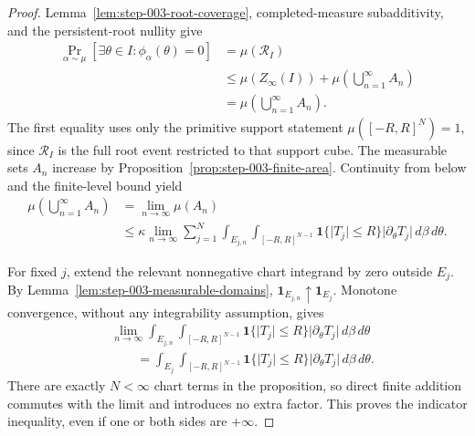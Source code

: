 \begin{proof}
Lemma~\ref{lem:step-003-root-coverage}, completed-measure subadditivity, and the
persistent-root nullity give
\begin{equation}
\label{eq:appendix-display-099}
\begin{aligned}
\Pr_{\alpha\sim\mu}
[\exists\theta\in I:\phi_\alpha(\theta)=0]
&=\mu(\mathcal R_I)\\
&\leq
\mu(Z_\infty(I))
+\mu\left(\bigcup_{n=1}^{\infty}A_n\right)\\
&=
\mu\left(\bigcup_{n=1}^{\infty}A_n\right).
\end{aligned}
\end{equation}
The first equality uses only the primitive support statement
\(\mu([-R,R]^N)=1\), since \(\mathcal R_I\) is the full root event restricted to that support cube.
The measurable sets \(A_n\) increase by
Proposition~\ref{prop:step-003-finite-area}. Continuity from below and the finite-level bound yield
\begin{equation}
\label{eq:appendix-display-100}
\begin{aligned}
\mu\left(\bigcup_{n=1}^{\infty}A_n\right)
&=\lim_{n\to\infty}\mu(A_n)\\
&\leq
\kappa\lim_{n\to\infty}
\sum_{j=1}^N
\int_{E_{j,n}}\int_{[-R,R]^{N-1}}
\mathbf 1\{\lvert T_j\rvert\leq R\}
\lvert\partial_\theta T_j\rvert
\,d\beta\,d\theta.
\end{aligned}
\end{equation}

For fixed \(j\), extend the relevant nonnegative chart integrand by zero outside \(E_j\). By
Lemma~\ref{lem:step-003-measurable-domains},
\(\mathbf 1_{E_{j,n}}\uparrow\mathbf 1_{E_j}\). Monotone convergence, without any integrability
assumption, gives
\begin{equation}
\label{eq:appendix-display-101}
\begin{aligned}
&\lim_{n\to\infty}
\int_{E_{j,n}}\int_{[-R,R]^{N-1}}
\mathbf 1\{\lvert T_j\rvert\leq R\}
\lvert\partial_\theta T_j\rvert
\,d\beta\,d\theta\\
&\qquad=
\int_{E_j}\int_{[-R,R]^{N-1}}
\mathbf 1\{\lvert T_j\rvert\leq R\}
\lvert\partial_\theta T_j\rvert
\,d\beta\,d\theta.
\end{aligned}
\end{equation}
There are exactly \(N<\infty\) chart terms in the proposition, so direct finite addition commutes with the limit and
introduces no extra factor. This proves the indicator inequality, even if one or both sides are \(+\infty\).


\end{proof}
